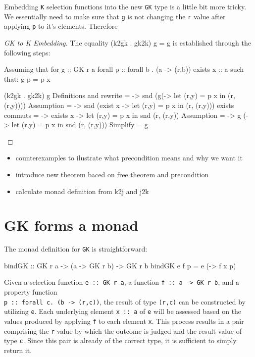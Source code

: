 \documentclass[runningheads]{llncs}
\providecommand{\tightlist}{%
  \setlength{\itemsep}{0pt}\setlength{\parskip}{0pt}}
\begin{document}
Embedding \texttt{K} selection functions into the new \texttt{GK} type
is a little bit more tricky. We essentially need to make sure that
\texttt{g} is not changing the \texttt{r} value after applying
\texttt{p} to it's elements. Therefore

\begin{proof}[GK to K Embedding]
The equality (k2gk . gk2k) g = g is established through the following steps:

Assuming that for 
g :: GK r a
forall p :: forall b . (a -> (r,b))
exists x :: a
such that:
g p = p x

\begin{haskell}
(k2gk . gk2k) g
{{ Definitions and rewrite }}
= \p -> snd (g(\x -> let (r,y) = p x in (r, (r,y))))
{{ Assumption }}
= \p -> snd (exist x -> let (r,y) = p x in (r, (r,y)))
{{ exists commuts }}
= \p -> exists x -> let (r,y) = p x in snd (r, (r,y))
{{ Assumption }}
= \p -> g (\x -> let (r,y) = p x in snd (r, (r,y)))
{{ Simplify }}
= g
\end{haskell}
\end{proof}

\begin{itemize}
\tightlist
\item
  counterexamples to ilustrate what precondition means and why we want
  it
\item
  introduce new theorem baced on free theorem and precondition
\item
  calculate monad definition from k2j and j2k
\end{itemize}

\section{GK forms a monad}\label{gk-forms-a-monad}

The monad definition for \texttt{GK} is straightforward:

\begin{code}
bindGK :: GK r a -> (a -> GK r b) -> GK r b
bindGK e f p = e (\x -> f x p)
\end{code}

Given a selection function \texttt{e\ ::\ GK\ r\ a}, a function
\texttt{f\ ::\ a\ -\textgreater{}\ GK\ r\ b}, and a property function\\
\texttt{p\ ::\ forall\ c.\ (b\ -\textgreater{}\ (r,c))}, the result of
type \texttt{(r,c)} can be constructed by utilizing \texttt{e}. Each
underlying element \texttt{x\ ::\ a} of \texttt{e} will be assessed
based on the values produced by applying \texttt{f} to each element
\texttt{x}. This process results in a pair comprising the \texttt{r}
value by which the outcome is judged and the result value of type
\texttt{c}. Since this pair is already of the correct type, it is
sufficient to simply return it.
\end{document}
